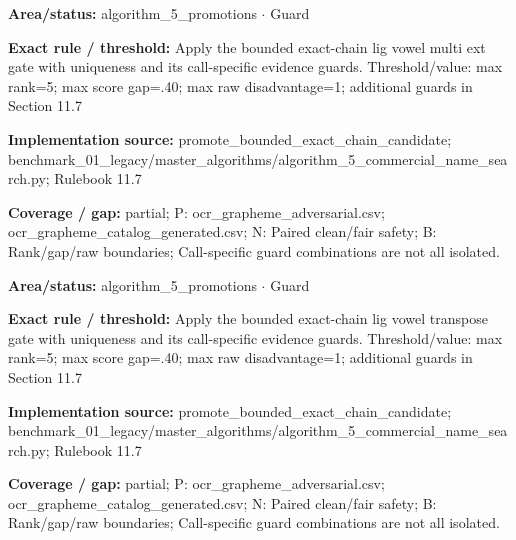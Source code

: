 \begin{tcolorbox}[enhanced,breakable,colback=white,colframe=Muted!45,boxrule=0.45pt,arc=1.5pt,left=6pt,right=6pt,top=5pt,bottom=5pt,title={\texttt{A5-CHAIN-LIG-VOWEL-MULTI-EXT}},title after break={\texttt{A5-CHAIN-LIG-VOWEL-MULTI-EXT}\ (continued)},fonttitle=\headingfont\bfseries\color{Navy},coltitle=Navy]
\textbf{Area/status:} algorithm\_\allowbreak{}5\_\allowbreak{}promotions $\boldsymbol{\cdot}$ Guard\par
\smallskip
\textbf{Exact rule / threshold:} Apply the bounded exact-chain lig vowel multi ext gate with uniqueness and its call-specific evidence guards. Threshold/\allowbreak{}value: max rank=5; max score gap=.40; max raw disadvantage=1; additional guards in Section 11.7\par
\smallskip
\textbf{Implementation source:} promote\_\allowbreak{}bounded\_\allowbreak{}exact\_\allowbreak{}chain\_\allowbreak{}candidate; benchmark\_\allowbreak{}01\_\allowbreak{}legacy/\allowbreak{}master\_\allowbreak{}algorithms/\allowbreak{}algorithm\_\allowbreak{}5\_\allowbreak{}commercial\_\allowbreak{}name\_\allowbreak{}search.py; Rulebook 11.7\par
\smallskip
\textbf{Coverage / gap:} partial; P: ocr\_\allowbreak{}grapheme\_\allowbreak{}adversarial.csv; ocr\_\allowbreak{}grapheme\_\allowbreak{}catalog\_\allowbreak{}generated.csv; N: Paired clean/\allowbreak{}fair safety; B: Rank/\allowbreak{}gap/\allowbreak{}raw boundaries; Call-specific guard combinations are not all isolated.
\end{tcolorbox}
\begin{tcolorbox}[enhanced,breakable,colback=white,colframe=Muted!45,boxrule=0.45pt,arc=1.5pt,left=6pt,right=6pt,top=5pt,bottom=5pt,title={\texttt{A5-CHAIN-LIG-VOWEL-TRANSPOSE}},title after break={\texttt{A5-CHAIN-LIG-VOWEL-TRANSPOSE}\ (continued)},fonttitle=\headingfont\bfseries\color{Navy},coltitle=Navy]
\textbf{Area/status:} algorithm\_\allowbreak{}5\_\allowbreak{}promotions $\boldsymbol{\cdot}$ Guard\par
\smallskip
\textbf{Exact rule / threshold:} Apply the bounded exact-chain lig vowel transpose gate with uniqueness and its call-specific evidence guards. Threshold/\allowbreak{}value: max rank=5; max score gap=.40; max raw disadvantage=1; additional guards in Section 11.7\par
\smallskip
\textbf{Implementation source:} promote\_\allowbreak{}bounded\_\allowbreak{}exact\_\allowbreak{}chain\_\allowbreak{}candidate; benchmark\_\allowbreak{}01\_\allowbreak{}legacy/\allowbreak{}master\_\allowbreak{}algorithms/\allowbreak{}algorithm\_\allowbreak{}5\_\allowbreak{}commercial\_\allowbreak{}name\_\allowbreak{}search.py; Rulebook 11.7\par
\smallskip
\textbf{Coverage / gap:} partial; P: ocr\_\allowbreak{}grapheme\_\allowbreak{}adversarial.csv; ocr\_\allowbreak{}grapheme\_\allowbreak{}catalog\_\allowbreak{}generated.csv; N: Paired clean/\allowbreak{}fair safety; B: Rank/\allowbreak{}gap/\allowbreak{}raw boundaries; Call-specific guard combinations are not all isolated.
\end{tcolorbox}
